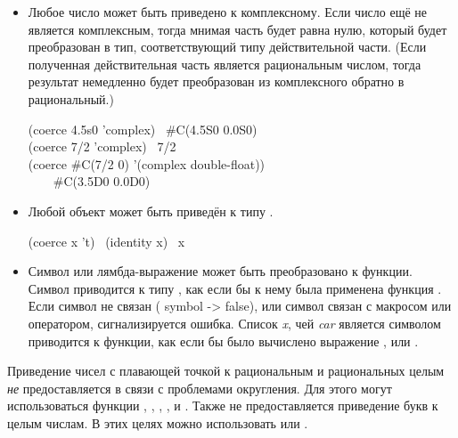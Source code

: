 \begin{defun}[Функция]
\begin{itemize}
  \begin{lisp}
    (coerce 0 'short-float) \EV\ 0.0S0 \\
    (coerce 3.5L0 'float) \EV\ 3.5L0 \\
    (coerce 7/2 'float) \EV\ 3.5
  \end{lisp}

\item Любое число может быть приведено к комплексному. Если число ещё
  не является комплексным, тогда мнимая часть будет равна нулю,
  который будет преобразован в тип, соответствующий типу
  действительной части. (Если полученная действительная часть является
  рациональным числом, тогда результат немедленно будет преобразован
  из комплексного обратно в рациональный.)

  \begin{lisp}
    (coerce 4.5s0 'complex) \EV\ \#C(4.5S0 0.0S0) \\
    (coerce 7/2 'complex) \EV\ 7/2 \\
    (coerce \#C(7/2 0) '(complex double-float)) \\
    ~~~\EV\ \#C(3.5D0 0.0D0)
  \end{lisp}

\item Любой объект может быть приведён к типу .
  \begin{lisp}
    (coerce x 't) \EQ\ (identity x) \EQ\ x
  \end{lisp}

\item Символ или лямбда-выражение может быть преобразовано к функции.
  Символ приводится к типу , как если бы к нему была
  применена функция . Если символ не связан
  ( symbol -> false), или символ связан с макросом или
  оператором, сигнализируется ошибка.  Список \emph{x}, чей \emph{car}
  является символом  приводится к функции, как если бы
  было вычислено выражение , или
  .
\end{itemize}

Приведение чисел с плавающей точкой к рациональным и рациональных целым
\emph{не} предоставляется в связи с проблемами округления. Для этого могут
использоваться функции , ,
, ,  и . Также не предоставляется
приведение букв к целым числам. В этих целях можно использовать
 или .
\end{defun}

